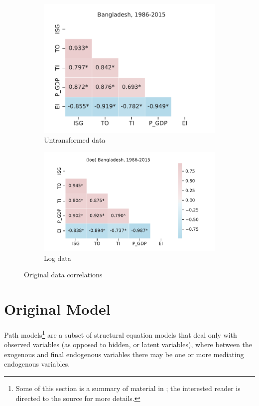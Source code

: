 \documentclass[11pt,a4paper]{article}
\begin{document}
\begin{figure}[tbp]
\centering
\begin{subfigure}{0.43\textwidth}
\includegraphics[width=\textwidth]{./plots/BGD_201805_correlations.pdf}
\caption{Untransformed data}
\end{subfigure}%
\begin{subfigure}{0.57\textwidth}
\includegraphics[width=\textwidth]{./plots/BGD_201805_correlations_log.pdf}
\caption{Log data}
\end{subfigure}
\caption{Original data correlations}
\label{fig:original_summary_corr}
\end{figure}

\section{Original Model}\label{sec:original_model}
Path models\footnote{ 
Some of this section is a summary of material in \cite{klinePrinciplesPracticeStructural2016}; the interested reader is directed to the source for more details.
} are a subset of structural equation models that deal only with observed variables (as opposed to hidden, or latent variables), where between the exogenous and final endogenous variables there may be one or more mediating endogenous variables.
\end{document}
